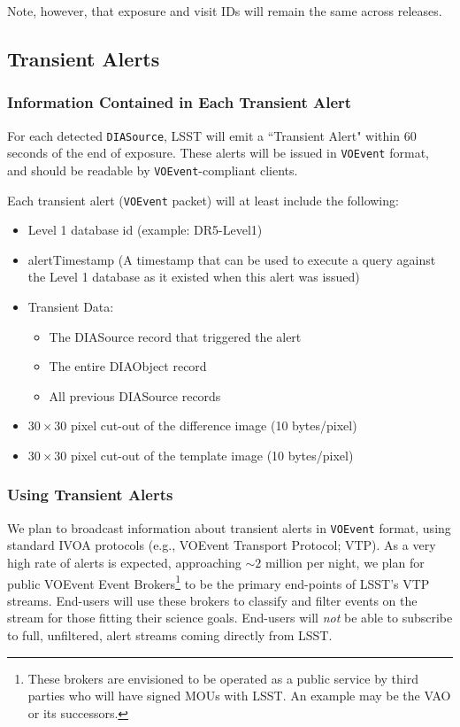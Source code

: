 \documentclass[12pt]{article}
\newcommand{\code}[1]{\texttt{#1}}
\newcommand{\DIASource}{\code{DIASource}\xspace}
\newcommand{\DB}{{Level 1 database}\xspace}
\newcommand{\VOEvent}{\code{VOEvent}\xspace}
\begin{document}
Note, however, that exposure and visit IDs will remain the same across releases.

\subsection{Transient Alerts}
\label{sec:voEventContents}

\subsubsection{Information Contained in Each Transient Alert}

For each detected \DIASource, LSST will emit a ``Transient Alert" within 60 seconds of the end of exposure. These alerts will be issued in \VOEvent format, and should be readable by \VOEvent-compliant clients.

\vspace{1em}
Each transient alert (\VOEvent packet) will at least include the following:

\begin{itemize}
\item \DB id (example: DR5-Level1)
\item alertTimestamp (A timestamp that can be used to execute a query against the \DB as it existed when this alert was issued)
\item Transient Data:
    \begin{itemize}
    \item The DIASource record that triggered the alert
    \item The entire DIAObject record
    \item All previous DIASource records
    \end{itemize}
\item $30\times 30$ pixel cut-out of the difference image (10 bytes/pixel)
\item $30\times 30$ pixel cut-out of the template image (10 bytes/pixel)
\end{itemize}

\subsubsection{Using Transient Alerts}
\label{sec:eventbrokers}

We plan to broadcast information about transient alerts in \VOEvent format, using standard IVOA protocols (e.g., VOEvent Transport Protocol; VTP). As a very high rate of alerts is expected, approaching $\sim 2$ million per night, we plan for public VOEvent Event Brokers\footnote{These brokers are envisioned to be operated as a public service by third parties who will have signed MOUs with LSST. An example may be the VAO or its successors.} to be the primary end-points of LSST's VTP streams. End-users will use these brokers to classify and filter events on the stream for those fitting their science goals. End-users will {\em not} be able to subscribe to full, unfiltered, alert streams coming directly from LSST.
\end{document}
